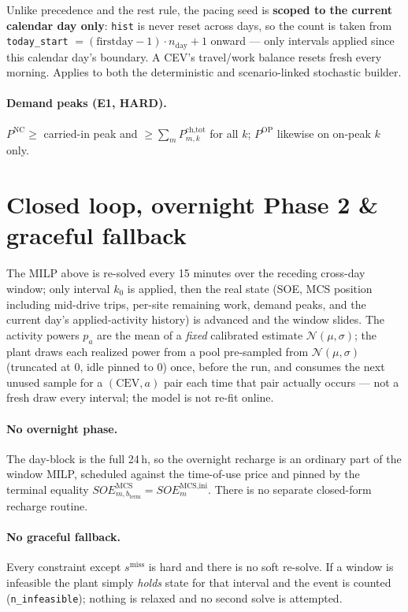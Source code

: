 \documentclass[11pt]{article}
\begin{document}
Unlike precedence and the rest rule, the pacing seed is \textbf{scoped to the current calendar day
only}: \texttt{hist} is never reset across days, so the count is taken from
\texttt{today\_start} $= (\text{firstday}-1)\cdot n_{\text{day}} + 1$ onward --- only intervals
applied since this calendar day's boundary. A CEV's travel/work balance resets fresh every
morning. Applies to both the deterministic and scenario-linked stochastic builder.

\paragraph{Demand peaks (E1, HARD).}
$P^{\text{NC}}\ge$ carried-in peak and $\ge\sum_m P^{\text{ch,tot}}_{m,k}$ for all $k$;
$P^{\text{OP}}$ likewise on on-peak $k$ only.

\section{Closed loop, overnight Phase 2 \& graceful fallback}
The MILP above is re-solved every 15 minutes over the receding cross-day window; only interval
$k_0$ is applied, then the real state (SOE, MCS position including mid-drive trips, per-site
remaining work, demand peaks, and the current day's applied-activity history) is advanced and the
window slides. The activity powers $p_a$ are the mean of a \emph{fixed} calibrated estimate
$\mathcal{N}(\mu,\sigma)$; the plant draws each realized power from a pool pre-sampled from
$\mathcal{N}(\mu,\sigma)$ (truncated at $0$, idle pinned to $0$) once, before the run, and
consumes the next unused sample for a $(\text{CEV},a)$ pair each time that pair actually occurs
--- not a fresh draw every interval; the model is not re-fit online.

\paragraph{No overnight phase.} The day-block is the full 24\,h, so the overnight recharge is an
ordinary part of the window MILP, scheduled against the time-of-use price and pinned by the
terminal equality $SOE^{\text{MCS}}_{m,b_{\text{term}}}=SOE^{\text{MCS,ini}}_m$. There is no
separate closed-form recharge routine.

\paragraph{No graceful fallback.} Every constraint except $s^{\text{miss}}$ is hard and there is no
soft re-solve. If a window is infeasible the plant simply \emph{holds} state for that interval and
the event is counted (\texttt{n\_infeasible}); nothing is relaxed and no second solve is attempted.
\end{document}
